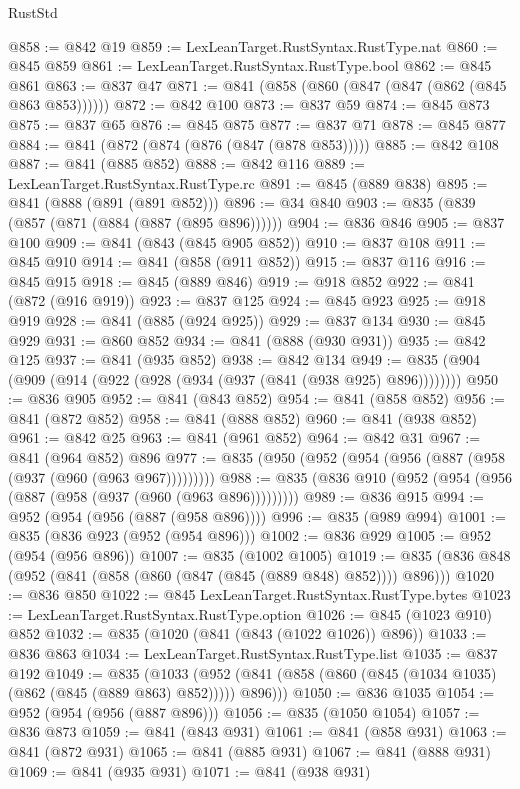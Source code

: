 \begin{lexlean}{RustStd}
\begin{coremodule}
{\begin{coremodule}
{{{{{{{{{{@858 := @842 @19
@859 := LexLeanTarget.RustSyntax.RustType.nat
@860 := @845 @859
@861 := LexLeanTarget.RustSyntax.RustType.bool
@862 := @845 @861
@863 := @837 @47
@871 := @841 (@858 (@860 (@847 (@847 (@862 (@845 @863 @853))))))
@872 := @842 @100
@873 := @837 @59
@874 := @845 @873
@875 := @837 @65
@876 := @845 @875
@877 := @837 @71
@878 := @845 @877
@884 := @841 (@872 (@874 (@876 (@847 (@878 @853)))))
@885 := @842 @108
@887 := @841 (@885 @852)
@888 := @842 @116
@889 := LexLeanTarget.RustSyntax.RustType.rc
@891 := @845 (@889 @838)
@895 := @841 (@888 (@891 (@891 @852)))
@896 := @34 @840
@903 := @835 (@839 (@857 (@871 (@884 (@887 (@895 @896))))))
@904 := @836 @846
@905 := @837 @100
@909 := @841 (@843 (@845 @905 @852))
@910 := @837 @108
@911 := @845 @910
@914 := @841 (@858 (@911 @852))
@915 := @837 @116
@916 := @845 @915
@918 := @845 (@889 @846)
@919 := @918 @852
@922 := @841 (@872 (@916 @919))
@923 := @837 @125
@924 := @845 @923
@925 := @918 @919
@928 := @841 (@885 (@924 @925))
@929 := @837 @134
@930 := @845 @929
@931 := @860 @852
@934 := @841 (@888 (@930 @931))
@935 := @842 @125
@937 := @841 (@935 @852)
@938 := @842 @134
@949 := @835 (@904 (@909 (@914 (@922 (@928 (@934 (@937 (@841 (@938 @925) @896))))))))
@950 := @836 @905
@952 := @841 (@843 @852)
@954 := @841 (@858 @852)
@956 := @841 (@872 @852)
@958 := @841 (@888 @852)
@960 := @841 (@938 @852)
@961 := @842 @25
@963 := @841 (@961 @852)
@964 := @842 @31
@967 := @841 (@964 @852) @896
@977 := @835 (@950 (@952 (@954 (@956 (@887 (@958 (@937 (@960 (@963 @967)))))))))
@988 := @835 (@836 @910 (@952 (@954 (@956 (@887 (@958 (@937 (@960 (@963 @896)))))))))
@989 := @836 @915
@994 := @952 (@954 (@956 (@887 (@958 @896))))
@996 := @835 (@989 @994)
@1001 := @835 (@836 @923 (@952 (@954 @896)))
@1002 := @836 @929
@1005 := @952 (@954 (@956 @896))
@1007 := @835 (@1002 @1005)
@1019 := @835 (@836 @848 (@952 (@841 (@858 (@860 (@847 (@845 (@889 @848) @852)))) @896)))
@1020 := @836 @850
@1022 := @845 LexLeanTarget.RustSyntax.RustType.bytes
@1023 := LexLeanTarget.RustSyntax.RustType.option
@1026 := @845 (@1023 @910) @852
@1032 := @835 (@1020 (@841 (@843 (@1022 @1026)) @896))
@1033 := @836 @863
@1034 := LexLeanTarget.RustSyntax.RustType.list
@1035 := @837 @192
@1049 := @835
    (@1033 (@952 (@841 (@858 (@860 (@845 (@1034 @1035) (@862 (@845 (@889 @863) @852))))) @896)))
@1050 := @836 @1035
@1054 := @952 (@954 (@956 (@887 @896)))
@1056 := @835 (@1050 @1054)
@1057 := @836 @873
@1059 := @841 (@843 @931)
@1061 := @841 (@858 @931)
@1063 := @841 (@872 @931)
@1065 := @841 (@885 @931)
@1067 := @841 (@888 @931)
@1069 := @841 (@935 @931)
@1071 := @841 (@938 @931)
}}}}}}}}}}
\end{coremodule}}
\end{coremodule}
\end{lexlean}
